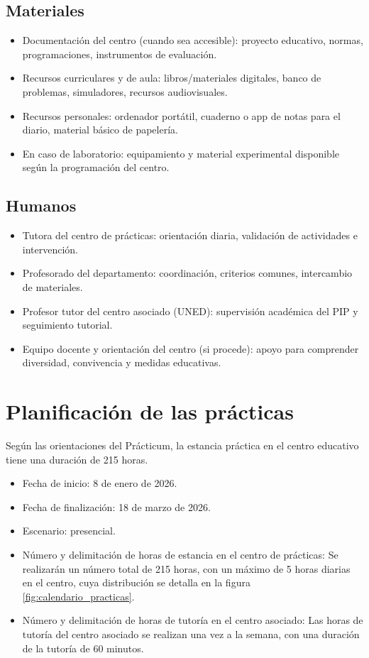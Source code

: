 \documentclass[12pt,a4paper]{article}
\begin{document}
\subsection{Materiales}\label{subsec:materiales}
\begin{itemize}
  \item Documentación del centro (cuando sea accesible): proyecto educativo, normas, programaciones, instrumentos de evaluación.
  \item Recursos curriculares y de aula: libros/materiales digitales, banco de problemas, simuladores, recursos audiovisuales.
  \item Recursos personales: ordenador portátil, cuaderno o app de notas para el diario, material básico de papelería.
  \item En caso de laboratorio: equipamiento y material experimental disponible según la programación del centro.
\end{itemize}

\subsection{Humanos}\label{subsec:humanos}
\begin{itemize}
  \item Tutora del centro de prácticas: orientación diaria, validación de actividades e intervención.
  \item Profesorado del departamento: coordinación, criterios comunes, intercambio de materiales.
  \item Profesor tutor del centro asociado (UNED): supervisión académica del PIP y seguimiento tutorial.
  \item Equipo docente y orientación del centro (si procede): apoyo para comprender diversidad, convivencia y medidas educativas.
\end{itemize}

\section{Planificación de las prácticas}\label{subsec:planificacion}
Según las orientaciones del Prácticum, la estancia práctica en el centro educativo tiene una duración de 215 horas.

\begin{itemize}
  \item Fecha de inicio: 8 de enero de 2026.
  \item Fecha de finalización: 18 de marzo de 2026.
  \item Escenario: presencial.
  \item Número y delimitación de horas de estancia en el centro de prácticas: Se realizarán un número total de 215 horas, con un máximo de 5 horas diarias en el centro, cuya distribución se detalla en la figura \ref{fig:calendario_practicas}.
  \item Número y delimitación de horas de tutoría en el centro asociado: Las horas de tutoría del centro asociado se realizan una vez a la semana, con una duración de la tutoría de 60 minutos.
\end{itemize}
\end{document}

